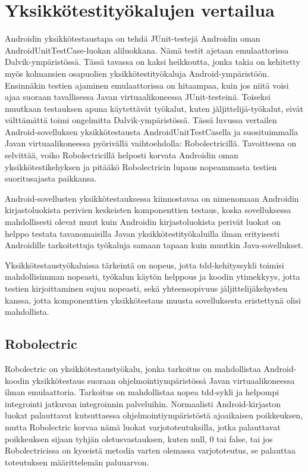 \section{Yksikkötestityökalujen vertailua}

Androidin yksikkötestaustapa on tehdä JUnit-testejä Androidin oman AndroidUnitTestCase-luokan aliluokkana. Nämä testit ajetaan emulaattorissa Dalvik-ympäristössä. Tässä tavassa on kaksi heikkoutta, jonka takia on kehitetty myös kolmansien osapuolien yksikkötestityökaluja Android-ympäristöön. Ensinnäkin testien ajaminen emulaattorissa on hitaampaa, kuin jos niitä voisi ajaa suoraan tavallisessa Javan virtuaalikoneessa JUnit-testeinä. Toiseksi muutkaan testauksen apuna käytettävät työkalut, kuten jäljittelijä-työkalut, eivät välttämättä toimi ongelmitta Dalvik-ympäristössä. Tässä luvussa vertailen Android-sovelluksen yksikkötestausta AndroidUnitTestCasella ja suosituimmalla Javan virtuaalikoneessa pyörivällä vaihtoehdolla: Robolectricillä. Tavoitteena on selvittää, voiko Robolectricillä helposti korvata Androidin oman yksikkötestikehyksen ja pitääkö Robolectricin lupaus nopeammasta testien suoritusajasta paikkansa.

Android-sovellusten yksikkötestauksessa kiinnostavaa on nimenomaan Androidin kirjastoluokista perivien keskeisten komponenttien testaus, koska sovelluksessa mahdollisesti olevat muut kuin Androidin kirjastoluokista perivät luokat on helppo testata tavanomaisilla Javan yksikkötestityökaluilla ilman erityisesti Androidille tarkoitettuja työkaluja samaan tapaan kuin muutkin Java-sovellukset.

Yksikkötestaustyökaluissa tärkeintä on nopeus, jotta tdd-kehityssykli toimisi mahdollisimman nopeasti, työkalun käytön helppous ja koodin ytimekkyys, jotta testien kirjoittaminen sujuu nopeasti, sekä yhteensopivuus jäljittelijäkehysten kanssa, jotta komponenttien yksikkötestaus muusta sovelluksesta eristettynä olisi mahdollista.

\subsection{Robolectric}

Robolectric on yksikkötestaustyökalu, jonka tarkoitus on mahdollistaa Android-koodin yksikkötestaus suoraan ohjelmointiympäristössä Javan virtuaalikoneessa ilman emulaattoria. Tarkoitus on mahdollistaa nopea tdd-sykli ja helpompi integrointi jatkuvan integroinnin palveluihin. Normaalisti Android-kirjaston luokat palauttavat kutsuttaessa ohjelmointiympäristöstä ajoaikaisen poikkeuksen, mutta Robolectric korvaa nämä luokat varjototeutuksilla, jotka palauttavat poikkeuksen sijaan tyhjän oletusvastauksen, kuten null, 0 tai false, tai jos Robolectricissa on kyseistä metodia varten olemassa varjototeutus, se palauttaa toteutuksen määrittelemän paluuarvon.

